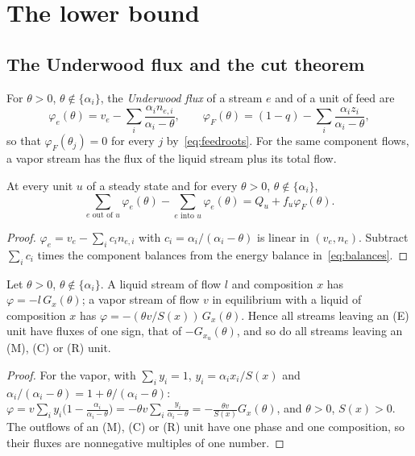 \documentclass[11pt,a4paper]{report}
\begin{document}
\section{The lower bound}\label{sec:bound}

\subsection{The Underwood flux and the cut theorem}

For \(\theta>0\), \(\theta\notin\{\alpha_i\}\), the \emph{Underwood flux} of a stream \(e\) and of a unit of feed are
\begin{equation}\label{eq:flux}
\varphi_e(\theta)=v_e-\sum_i\frac{\alpha_in_{e,i}}{\alpha_i-\theta},\qquad
\varphi_F(\theta)=(1-q)-\sum_i\frac{\alpha_iz_i}{\alpha_i-\theta},
\end{equation}
so that \(\varphi_F(\theta_j)=0\) for every \(j\) by~\eqref{eq:feedroots}. For the same component flows, a vapor stream has
the flux of the liquid stream plus its total flow.

\begin{lemma}\label{lem:node}
At every unit \(u\) of a steady state and for every \(\theta>0\), \(\theta\notin\{\alpha_i\}\),
\[\sum_{e\text{ out of }u}\varphi_e(\theta)-\sum_{e\text{ into }u}\varphi_e(\theta)=Q_u+f_u\varphi_F(\theta).\]
\end{lemma}
\begin{proof}
\(\varphi_e=v_e-\sum_ic_in_{e,i}\) with \(c_i=\alpha_i/(\alpha_i-\theta)\) is linear in \((v_e,n_e)\). Subtract \(\sum_ic_i\) times the
component balances from the energy balance in~\eqref{eq:balances}.
\end{proof}

\begin{lemma}\label{lem:uniform}
Let \(\theta>0\), \(\theta\notin\{\alpha_i\}\). A liquid stream of flow \(l\) and composition \(x\) has
\(\varphi=-l\,G_x(\theta)\); a vapor stream of flow \(v\) in equilibrium with a liquid of composition \(x\) has
\(\varphi=-(\theta v/S(x))\,G_x(\theta)\). Hence all streams leaving an (E) unit have fluxes of one sign, that of
\(-G_{x_u}(\theta)\), and so do all streams leaving an (M), (C) or (R) unit.
\end{lemma}
\begin{proof}
For the vapor, with \(\sum_iy_i=1\), \(y_i=\alpha_ix_i/S(x)\) and \(\alpha_i/(\alpha_i-\theta)=1+\theta/(\alpha_i-\theta)\):
\(\varphi=v\sum_iy_i\bigl(1-\frac{\alpha_i}{\alpha_i-\theta}\bigr)=-\theta v\sum_i\frac{y_i}{\alpha_i-\theta}=-\frac{\theta v}{S(x)}G_x(\theta)\), and
\(\theta>0\), \(S(x)>0\). The outflows of an (M), (C) or (R) unit have one phase and one composition, so their fluxes are
nonnegative multiples of one number.
\end{proof}
\end{document}
